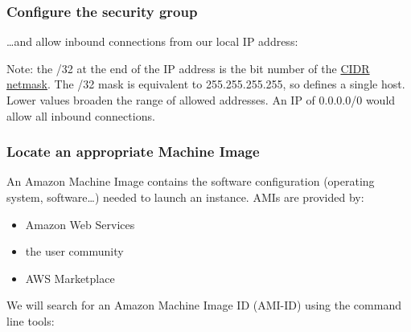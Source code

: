 \subsubsection{Configure the security
group}\label{configure-the-security-group}

\ldots{}and allow inbound connections from our local IP address:

\begin{Shaded}
\begin{Highlighting}[]
\NormalTok{$ } 
    \NormalTok{\textbackslash{}}
   \KeywordTok{<}\KeywordTok{>}\NormalTok{/32 \textbackslash{}}
   \NormalTok{22 \textbackslash{}}
   
\end{Highlighting}
\end{Shaded}

Note: the /32 at the end of the IP address is the bit number of the
\href{http://en.wikipedia.org/wiki/Classless_Inter-Domain_Routing}{CIDR
netmask}. The /32 mask is equivalent to 255.255.255.255, so defines a
single host. Lower values broaden the range of allowed addresses. An IP
of 0.0.0.0/0 would allow all inbound connections.

\subsubsection{Locate an appropriate Machine
Image}\label{locate-an-appropriate-machine-image}

An Amazon Machine Image contains the software configuration (operating
system, software\ldots{}) needed to launch an instance. AMIs are
provided by:

\begin{itemize}
\itemsep1pt\parskip0pt
\item
  Amazon Web Services
\item
  the user community
\item
  AWS Marketplace
\end{itemize}

We will search for an Amazon Machine Image ID (AMI-ID) using the command
line tools:

\begin{Shaded}
\begin{Highlighting}[]
\NormalTok{$ } 
   
\end{Highlighting}
\end{Shaded}

